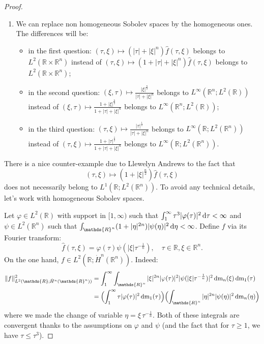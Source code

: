 \documentclass[a4paper, 12pt]{article}
\theoremstyle{plain}
\theoremstyle{definition}
\theoremstyle{remark}
\numberwithin{equation}{section}
\begin{document}
\begin{proof}
\begin{enumerate}
\noindent
Starting now from point 2, we show similarly, taking the inverse Fourier transform in the $\xi$ and the $\tau$ variables, 
that $f$ belongs to $H^{\frac{n}{2}}({\mathds{R}}^n;{\mathscr{C}}_0({\mathds{R}}))
\subset {\mathscr{C}}_0({\mathds{R}};H^{\frac{n}{2}}({\mathds{R}}^n))$.
%
\item
We can replace non homogeneous Sobolev spaces by the homogeneous ones. The differences will be:
%
\begin{itemize}
\item
in the first question: $(\tau,\xi)\mapsto (|\tau|+|\xi|^n)\hat{f}(\tau,\xi)$ belongs to $L^2({\mathds{R}}\times{\mathds{R}}^n)$ instead of
$(\tau,\xi)\mapsto (1+|\tau|+|\xi|^n)\hat{f}(\tau,\xi)$ belongs to $L^2({\mathds{R}}\times{\mathds{R}}^n)$;
\item
in the second question: $(\xi,\tau)\mapsto \frac{|\xi|^{\frac{n}{2}}}{|\tau|+|\xi|^n}$ belongs to $L^\infty({\mathds{R}}^n; L^2({\mathds{R}}))$
instead of $(\xi,\tau)\mapsto \frac{1+|\xi|^{\frac{n}{2}}}{1+|\tau|+|\xi|^n}$ belongs to $L^\infty({\mathds{R}}^n; L^2({\mathds{R}}))$;
\item
in the third question: $(\tau,\xi)\mapsto \frac{|\tau|^{\frac{1}{2}}}{|\tau|+|\xi|^n}$ belongs to $L^\infty({\mathds{R}};L^2({\mathds{R}}^n))$
instead of $(\tau,\xi)\mapsto \frac{1+|\tau|^{\frac{1}{2}}}{1+|\tau|+|\xi|^n}$ belongs to $L^\infty({\mathds{R}};L^2({\mathds{R}}^n))$.
\end{itemize}
%
\end{enumerate}
%
There is a nice counter-example due to Llewelyn Andrews to the fact that 
\[
(\tau,\xi)\mapsto  (1+|\xi|^{\frac{n}{2}})\hat{f}(\tau,\xi)
\] 
does not necessarily belong to $L^1({\mathds{R}};L^2({\mathds{R}}^n))$. To avoid any technical details,
let's work with homogeneous Sobolev spaces.

\noindent
Let $\varphi \in L^2({\mathds{R}})$ with support in $[1,\infty)$ such that $\int_1^\infty\tau^3|\varphi(\tau)|^2\,{\rm d}\tau <\infty$
and $\psi\in L^2({\mathds{R}}^n)$ such that $\int_{{\mathds{R}}^n}(1+|\eta|^{2n})|\psi(\eta)|^2\,{\rm d}\eta<\infty$.
Define $f$ via its Fourier transform: 
\[
\hat{f}(\tau,\xi)=\varphi(\tau)\psi(|\xi|\tau^{-\frac{1}{n}}), \quad \tau\in{\mathds{R}}, \xi\in {\mathds{R}}^n.
\]
On the one hand, $f\in L^2({\mathds{R}};\dot H^n({\mathds{R}}^n))$. Indeed:
%
\begin{align*}
\|f\|_{L^2({\mathds{R}};\dot H^n({\mathds{R}}^n))}^2&=
\int_1^\infty \int_{{\mathds{R}}^n} |\xi|^{2n}|\varphi(\tau)|^2|\psi(|\xi|\tau^{-\frac{1}{n}})|^2\,{\rm dm}_n(\xi)\,{\rm dm}_1(\tau)\\
&=\Bigl(\int_1^\infty \tau |\varphi(\tau)|^2\,{\rm dm}_1(\tau)\Bigr)\Bigl( \int_{{\mathds{R}}^n} |\eta|^{2n}|\psi(\eta)|^2\,{\rm dm}_n(\eta)\Bigr)
\end{align*}
% 
where we made the change of variable $\eta=\xi \,\tau^{-\frac{1}{n}}$. Both of these integrals are convergent thanks to the assumptions
on $\varphi$ and $\psi$ (and the fact that for $\tau\ge 1$, we have $\tau\le \tau^3$).


\end{proof}
\end{document}
